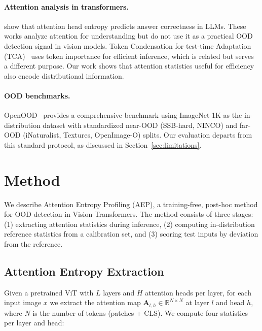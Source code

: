 \documentclass{article}
\newcommand{\AEP}{\textsc{AEP}}
\begin{document}
\paragraph{Attention analysis in transformers.}
\citet{ostmeier2026headentropy} show that attention head entropy predicts answer correctness in LLMs. These works analyze attention for understanding but do not use it as a practical OOD detection signal in vision models. Token Condensation for test-time Adaptation (TCA)~\citep{wang2025tca} uses token importance for efficient inference, which is related but serves a different purpose. Our work shows that attention statistics useful for efficiency also encode distributional information.

\paragraph{OOD benchmarks.}
OpenOOD~\citep{zhang2023openood} provides a comprehensive benchmark using ImageNet-1K as the in-distribution dataset with standardized near-OOD (SSB-hard, NINCO) and far-OOD (iNaturalist, Textures, OpenImage-O) splits. Our evaluation departs from this standard protocol, as discussed in Section~\ref{sec:limitations}.

\section{Method}
\label{sec:method}

We describe Attention Entropy Profiling (\AEP{}), a training-free, post-hoc method for OOD detection in Vision Transformers. The method consists of three stages: (1) extracting attention statistics during inference, (2) computing in-distribution reference statistics from a calibration set, and (3) scoring test inputs by deviation from the reference.

\subsection{Attention Entropy Extraction}

Given a pretrained ViT with $L$ layers and $H$ attention heads per layer, for each input image $x$ we extract the attention map $\mathbf{A}_{l,h} \in \mathbb{R}^{N \times N}$ at layer $l$ and head $h$, where $N$ is the number of tokens (patches + CLS). We compute four statistics per layer and head:
\end{document}
